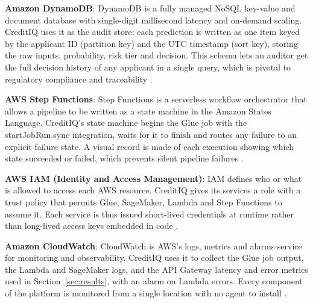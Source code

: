 \documentclass[conference]{IEEEtran}
\begin{document}
\textbf{Amazon DynamoDB}: DynamoDB is a fully managed NoSQL key-value and document database with single-digit millisecond latency and on-demand scaling. CreditIQ uses it as the audit store: each prediction is written as one item keyed by the applicant ID (partition key) and the UTC timestamp (sort key), storing the raw inputs, probability, risk tier and decision. This schema lets an auditor get the full decision history of any applicant in a single query, which is pivotal to regulatory compliance and traceability \cite{12}.

\textbf{AWS Step Functions}: Step Functions is a serverless workflow orchestrator that allows a pipeline to be written as a state machine in the Amazon States Language. CreditIQ's state machine begins the Glue job with the startJobRun.sync integration, waits for it to finish and routes any failure to an explicit failure state. A visual record is made of each execution showing which state succeeded or failed, which prevents silent pipeline failures \cite{14}.

\textbf{AWS IAM (Identity and Access Management)}: IAM defines who or what is allowed to access each AWS resource. CreditIQ gives its services a role with a trust policy that permits Glue, SageMaker, Lambda and Step Functions to assume it. Each service is thus issued short-lived credentials at runtime rather than long-lived access keys embedded in code \cite{12}.

\textbf{Amazon CloudWatch}: CloudWatch is AWS's logs, metrics and alarms service for monitoring and observability. CreditIQ uses it to collect the Glue job output, the Lambda and SageMaker logs, and the API Gateway latency and error metrics used in Section~\ref{sec:results}, with an alarm on Lambda errors. Every component of the platform is monitored from a single location with no agent to install \cite{15}.
\end{document}
